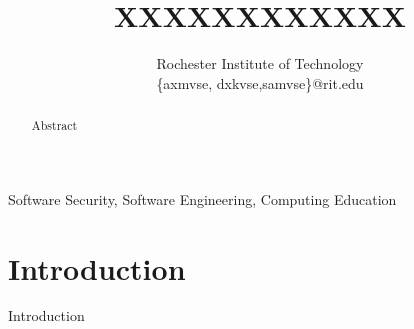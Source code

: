 \documentclass[conference]{IEEEtran}
\newcommand{\todo}[1]{\textcolor{cyan}{\textbf{[#1]}}}
\begin{document}
\title{XXXXXXXXXXXX}

\author{
Rochester Institute of Technology\\
\{axmvse, dxkvse,samvse\}@rit.edu

}


\maketitle
\begin{abstract}

Abstract

\end{abstract}

\begin{IEEEkeywords} Software Security, Software Engineering, Computing Education\end{IEEEkeywords}







\section{Introduction}

Introduction



\end{document}

